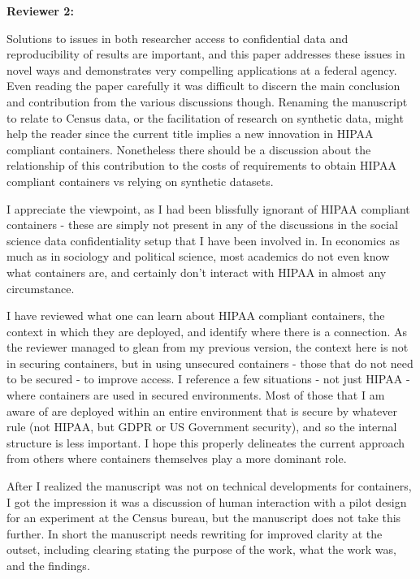\textbf{Reviewer 2:}

\begin{referee}
    Solutions to issues in both researcher access to confidential data and reproducibility of
results are important, and this paper addresses these issues in novel ways and demonstrates very
compelling applications at a federal agency. Even reading the paper carefully it was difficult to discern
the main conclusion and contribution from the various discussions though. Renaming the manuscript
to relate to Census data, or the facilitation of research on synthetic data, might help the reader since
the current title implies a new innovation in HIPAA compliant containers. Nonetheless there should be
a discussion about the relationship of this contribution to the costs of requirements to obtain HIPAA
compliant containers vs relying on synthetic datasets. 
\end{referee}

\begin{response}
    I appreciate the viewpoint, as I had been blissfully ignorant of HIPAA  compliant containers - these are simply not present in any of the discussions in the social science data confidentiality setup that I have been involved in. In economics as much as in sociology and political science, most academics do not even know what containers are, and certainly don't interact with HIPAA in almost any circumstance.

    I have reviewed what one can learn about HIPAA compliant containers, the context in which they are deployed, and identify where there is a connection. As the reviewer managed to glean from my previous version, the context here is not in securing containers, but in using unsecured containers - those that do not need to be secured - to improve access. I reference a few situations - not just HIPAA - where containers are used in secured environments. Most of those that I am aware of are deployed within an entire environment that is secure by whatever rule (not HIPAA, but GDPR or US Government security), and so the internal structure is less important. I hope this properly delineates the current approach from others where containers themselves play a more dominant role.
\end{response}

\begin{referee}
    
After I realized the manuscript was not on
technical developments for containers, I got the impression it was a discussion of human interaction
with a pilot design for an experiment at the Census bureau, but the manuscript
does not take this further. In short the manuscript needs rewriting for improved clarity at the outset,
including clearing stating the purpose of the work, what the work was, and the findings.

\end{referee}

